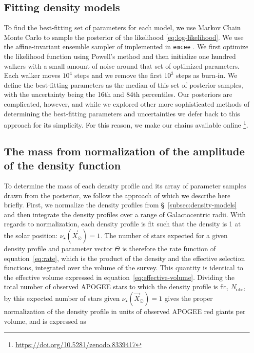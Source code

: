 \subsection{Fitting density models}
\label{subsec:fitting-density-models}

To find the best-fitting set of parameters for each model, we use Markov Chain Monte Carlo to sample the posterior of the likelihood \eqref{eq:log-likelihood}. We use the affine-invariant ensemble sampler of \textcite{goodman10} implemented in \texttt{emcee} \parencite{foreman-mackey13}. We first optimize the likelihood function using Powell's method \parencite{powell64} and then initialize one hundred walkers with a small amount of noise around that set of optimized parameters. Each walker moves $10^{4}$ steps and we remove the first $10^{3}$ steps as burn-in. We define the best-fitting parameters as the median of this set of posterior samples, with the uncertainty being the 16th and 84th percentiles. Our posteriors are complicated, however, and while we explored other more sophisticated methods of determining the best-fitting parameters and uncertainties we defer back to this approach for its simplicity. For this reason, we make our chains available online \footnote{\url{https://doi.org/10.5281/zenodo.8339417}}.

\subsection{The mass from normalization of the amplitude of the density function}
\label{subsec:mass-calculation-from-normalization}

To determine the mass of each density profile and its array of parameter samples drawn from the posterior, we follow the approach of \cite{mackereth20} which we describe here briefly. First, we normalize the density profiles from \S~\ref{subsec:density-models} and then integrate the density profiles over a range of Galactocentric radii. With regards to normalization, each density profile is fit such that the density is 1 at the solar position: $\nu_{\star}(\vec{X}_{\odot}) = 1$. The number of stars expected for a given density profile and parameter vector $\Theta$ is therefore the rate function of equation~\eqref{eq:rate}, which is the product of the density and the effective selection functions, integrated over the volume of the survey. This quantity is identical to the effective volume expressed in equation~\eqref{eq:effective-volume}. Dividing the total number of observed APOGEE stars to which the density profile is fit, $N_{\mathrm{obs}}$, by this expected number of stars given $\nu_{\star}(\vec{X}_{\odot}) = 1$ gives the proper normalization of the density profile in units of observed APOGEE red giants per volume, and is expressed as

